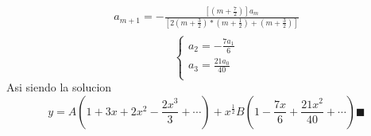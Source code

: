 \begin{mdframed}
\begin{gather*}
      a_{m+1}=-\frac{[({m+\frac{7}{2}})]a_m }{[2({m+\frac{3}{2}})*({m+\frac{1}{2}}) +({m+\frac{3}{2}})]}\\
\end{gather*}
  \begin{equation}
    \begin{cases}
        a_2=-\frac{7a_1}{6}\\
        a_3=\frac{21a_0}{40}\\
    \end{cases}
\end{equation}
Asi siendo la solucion
$$y = A(1+3x+2x^2-\frac{2x^3}{3}+\cdots)+x^{\frac{1}{2}}B(1-\frac{7x}{6}+\frac{21x^2}{40}+\cdots) \blacksquare$$
\end{mdframed}